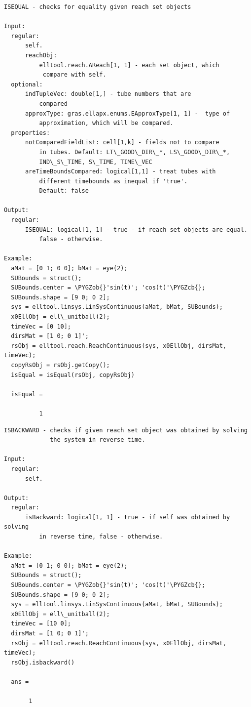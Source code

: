 \documentclass[letterpaper,10pt,english]{sphinxmanual}
\def\PYGZob{\char`\{}
\def\PYGZcb{\char`\}}
\begin{document}
\label{chap_func:elltool-reach-areach-isequal}
\begin{Verbatim}[commandchars=\\\{\}]
ISEQUAL - checks for equality given reach set objects

Input:
  regular:
      self.
      reachObj:
          elltool.reach.AReach[1, 1] - each set object, which
           compare with self.
  optional:
      indTupleVec: double[1,] - tube numbers that are
          compared
      approxType: gras.ellapx.enums.EApproxType[1, 1] -  type of
          approximation, which will be compared.
  properties:
      notComparedFieldList: cell[1,k] - fields not to compare
          in tubes. Default: LT\_GOOD\_DIR\_*, LS\_GOOD\_DIR\_*,
          IND\_S\_TIME, S\_TIME, TIME\_VEC
      areTimeBoundsCompared: logical[1,1] - treat tubes with
          different timebounds as inequal if 'true'.
          Default: false

Output:
  regular:
      ISEQUAL: logical[1, 1] - true - if reach set objects are equal.
          false - otherwise.

Example:
  aMat = [0 1; 0 0]; bMat = eye(2);
  SUBounds = struct();
  SUBounds.center = \PYGZob{}'sin(t)'; 'cos(t)'\PYGZcb{};
  SUBounds.shape = [9 0; 0 2];
  sys = elltool.linsys.LinSysContinuous(aMat, bMat, SUBounds);
  x0EllObj = ell\_unitball(2);
  timeVec = [0 10];
  dirsMat = [1 0; 0 1]';
  rsObj = elltool.reach.ReachContinuous(sys, x0EllObj, dirsMat, timeVec);
  copyRsObj = rsObj.getCopy();
  isEqual = isEqual(rsObj, copyRsObj)

  isEqual =

          1
\end{Verbatim}
\label{chap_func:elltool-reach-areach-isbackward}
\begin{Verbatim}[commandchars=\\\{\}]
ISBACKWARD - checks if given reach set object was obtained by solving
             the system in reverse time.

Input:
  regular:
      self.

Output:
  regular:
      isBackward: logical[1, 1] - true - if self was obtained by solving
          in reverse time, false - otherwise.

Example:
  aMat = [0 1; 0 0]; bMat = eye(2);
  SUBounds = struct();
  SUBounds.center = \PYGZob{}'sin(t)'; 'cos(t)'\PYGZcb{};
  SUBounds.shape = [9 0; 0 2];
  sys = elltool.linsys.LinSysContinuous(aMat, bMat, SUBounds);
  x0EllObj = ell\_unitball(2);
  timeVec = [10 0];
  dirsMat = [1 0; 0 1]';
  rsObj = elltool.reach.ReachContinuous(sys, x0EllObj, dirsMat, timeVec);
  rsObj.isbackward()

  ans =

       1
\end{Verbatim}
\end{document}
